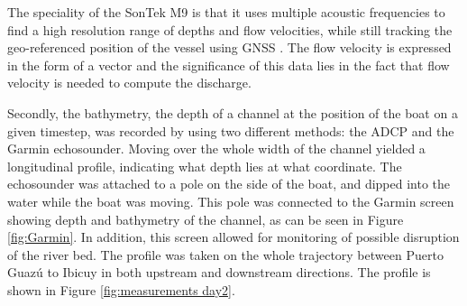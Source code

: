 The speciality of the SonTek M9 is that it uses multiple acoustic frequencies to find a high resolution range of depths and flow velocities, while still tracking the geo-referenced position of the vessel using GNSS \autocite{xylemSonTekM9}. The flow velocity is expressed in the form of a vector and the significance of this data lies in the fact that flow velocity is needed to compute the discharge.

Secondly, the bathymetry, the depth of a channel at the position of the boat on a given timestep, was recorded by using two different methods: the ADCP and the Garmin echosounder. Moving over the whole width of the channel yielded a longitudinal profile, indicating what depth lies at what coordinate.
The echosounder was attached to a pole on the side of the boat, and dipped into the water while the boat was moving. This pole was connected to the Garmin screen showing depth and bathymetry of the channel, as can be seen in Figure \ref{fig:Garmin}. In addition, this screen allowed for monitoring of possible disruption of the river bed. The profile was taken on the whole trajectory between Puerto Guazú to Ibicuy in both upstream and downstream directions. The profile is shown in Figure \ref{fig:measurements day2}.

